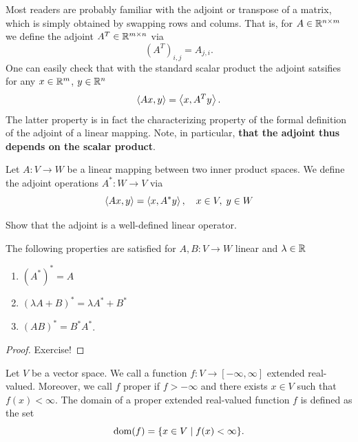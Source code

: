 Most readers are probably familiar with the adjoint or transpose of a matrix, which is simply obtained by swapping rows and colums. That is, for $A\in \mathbb{R}^{n\times m}$ we define the adjoint $A^T\in \mathbb{R}^{m\times n}$ via
\begin{equation}
    (A^T)_{i,j} = A_{j,i}.
\end{equation}
One can easily check that with the standard scalar product the adjoint satsifies for any $x\in \mathbb{R}^m$, $y\in \mathbb{R}^n$
\begin{equation}
    \left\langle Ax , y\right\rangle = \left\langle x , A^Ty\right\rangle.
\end{equation}
The latter property is in fact the characterizing property of the formal definition of the adjoint of a linear mapping. Note, in particular, \textbf{that the adjoint thus depends on the scalar product}.
\begin{defn}
    Let $A:V\rightarrow W$ be a linear mapping between two inner product spaces. We define the adjoint operations $A^*:W\rightarrow V$ via
    \begin{equation}
        \left\langle Ax , y\right\rangle = \left\langle x , A^*y\right\rangle,\quad x\in V,\; y\in W
    \end{equation}
\end{defn}
\begin{exercise}
Show that the adjoint is a well-defined linear operator.
\end{exercise}

\begin{lemma}
    The following properties are satisfied for $A,B:V\rightarrow W$ linear and $\lambda\in \mathbb{R}$
    \begin{enumerate}
        \item $(A^*)^* = A$
        \item $(\lambda A + B)^* = \lambda A^* + B^*$
        \item $(AB)^*=B^*A^*$.
    \end{enumerate}
\end{lemma}
\begin{proof}
    Exercise!
\end{proof}


\begin{defn}
    Let $V$ be a vector space. We call a function $f:V\rightarrow [-\infty,\infty]$ extended real-valued. Moreover, we call $f$ proper if $f>-\infty$ and there exists $x\in V$ such that $f(x)<\infty$. The domain of a proper extended real-valued function $f$ is defined as the set
    \begin{equation}
        \operatorname{\mathrm{dom}}(f) = \{x\in V\;|\; f(x)<\infty \}.
    \end{equation}
\end{defn}

